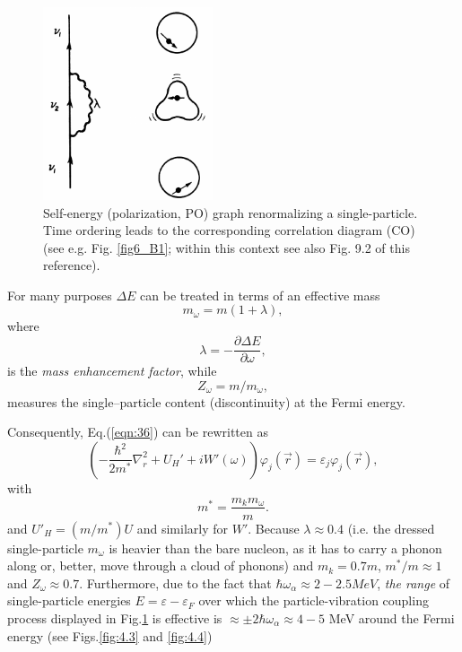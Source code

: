 \begin{figure}[h!]
\centerline {
\includegraphics*[width=5cm]{introduccion/figs/figintroD2}
}
\caption{Self-energy (polarization, PO) graph renormalizing  a single-particle. Time ordering leads to the corresponding correlation diagram (CO) (see e.g. Fig. \ref{fig6_B1}; within this context see also \cite{Brink:05} Fig. 9.2 of this reference).}
\label{fig:4.2}
\end{figure}
For many purposes $\Delta E$ can be treated in terms of an effective mass
\begin{equation}
m_{\omega} = m(1+\lambda),
\label{eqn:38}
\end{equation}
where
\begin{equation}
\lambda= - \frac{\partial \Delta E}{\partial \omega},
\label{eqn:39}
\end{equation}
is the {\it mass enhancement factor}, while
\begin{equation}
\nonumber
Z_{\omega}=m/m_{\omega},
\end{equation}
measures the single--particle content (discontinuity) at the Fermi energy.

Consequently, Eq.(\ref{eqn:36}) can be rewritten as
\begin{equation}
\left( - \frac{\hbar^2}{2m^*} \nabla_r^2 + U_H' + i W'(\omega) \right) \varphi_j(\vec{r}) = \varepsilon_j \varphi_j(\vec{r}),
\label{eqn:40a}
\end{equation}
with
\begin{equation}
m^* = \frac{m_k m_{\omega}}{m} .
\label{eqn:40b}
\end{equation}
 and $U'_H = (m/m^*) U$ and similarly for $W'$. Because $\lambda \approx 0.4$ (i.e. the dressed single-particle $m_{\omega}$ is heavier than the bare nucleon, as it has to carry a phonon along or, better, move through a cloud of phonons) and $m_k=0.7m$, $m^*/m \approx 1$ and $Z_{\omega} \approx 0.7$. Furthermore, due to the fact that $\hbar \omega_{\alpha} \approx 2-2.5 MeV$, {\it the range} of single-particle energies $E=\varepsilon-\varepsilon_F$ over which the particle-vibration coupling process displayed in Fig.\ref{fig:4.2} is effective is $\approx \pm 2\hbar \omega_{\alpha} \approx 4-5$ MeV around the Fermi energy (see Figs.\ref{fig:4.3} and \ref{fig:4.4})

